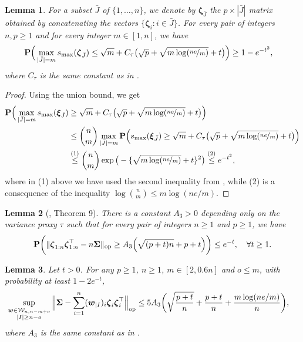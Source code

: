 \documentclass[aos,preprint,reqno]{imsart}
\newcommand\bxi{\boldsymbol\xi}
\newcommand\bzeta{\boldsymbol\zeta}
\newcommand\bSigma{\boldsymbol\Sigma}
\newcommand\bfP{\mathbf P}
\newcommand\bw{\boldsymbol w}
\theoremstyle{plain}
\newtheorem{lemma}{Lemma}
\theoremstyle{remark}
\begin{document}
	\begin{lemma} %
	For a subset $\bar J$ of $\{1,\ldots,n\}$, we denote by 
	$\bzeta_{\bar J}$ the $p\times |\bar J|$ matrix obtained by
	concatenating the vectors $\{\bzeta_i: i\in\bar J\}$. For every 
	pair of integers  $n,p\ge 1$ and for every integer $m\in[1,n]$,
	we have
	\begin{align}
		\bfP\Big(\max_{|\bar J| = m} s_{\max}(\bzeta_{\bar J}) &\le
				\sqrt{m} +  C_\tau\big(\sqrt{p} + \sqrt{m \log(\nicefrac{ne}{m})}
				+ t\big) \Big) \ge 1 - e^{-t^2},\label{esp:3bis}
	\end{align}	
	where $C_\tau$ is the same constant as in .
	\end{lemma} 
	\begin{proof}
	Using the union bound, we get
	\begin{align}
		\bfP\Big(\max_{|\bar J| = m} s_{\max}(\bxi_{\bar J}) &\ge
			\sqrt{m} +  C_\tau\big(\sqrt{p} + \sqrt{m \log( \nicefrac{ne}{m})} + t\big) \Big)\\ 
		&\le {n\choose{m}}\max_{|\bar J| = m} 
			\bfP\Big( s_{\max}(\bxi_{\bar J}) \ge \sqrt{m} +
			C_\tau\big(\sqrt{p} + \sqrt{m \log(\nicefrac{ne}{m})}+ 
			t\big) \Big)\\
		&\stackrel{(1)}{\le} {n\choose{m}} \exp\big(-\{
		\sqrt{m \log(\nicefrac{ne}{m})} +t\}^2\big)
		\stackrel{(2)}{\le} e^{-t^2},
	\end{align}	
	where in (1) above we have used the second inequality from
	, while (2) is a consequence of
	the inequality $\log{n\choose{m}}\le m\log(ne/m)$. 
	\end{proof}
    
	
	\begin{lemma}[\cite{KoltchLounici}, Theorem 9] \label{lem:smax:bis}
	There is a constant $A_3>0$ depending only on the variance proxy $\tau$ such that for every pair of integers
	$n\ge 1$ and $p\ge 1$, we have
	\begin{align}
		\bfP\bigg(\|\bzeta_{1:n}\bzeta_{1:n}^\top-n\bSigma\|_{\textup{op}}
		\ge A_3\Big(\sqrt{(p+t)n} + p + t\Big)\bigg)\le e^{-t},\quad \forall t\ge 1.
	\end{align}
	\end{lemma} 

    
    
	\begin{lemma}\label{lemma3:bis}
	Let $t>0$. For any $p\ge 1$, $n\ge 1$, $m\in[2,0.6n]$ and $o\le m$, with probability at least $1-2e^{-t}$,
	\begin{align}
		\sup_{\substack{\bw\in \mathcal W_{n,n-m+o} \\ |I| \ge n-o}}
		\Big\|\bSigma & - \sum_{i=1}^n (\bw_{|I})_i\bzeta_i\bzeta_i^\top
		\Big\|_{\textup{op}} \le  5A_3 \bigg( \sqrt{ \frac{p+t}{n}} + 
			\frac{p + t}{n} + \frac{m\log(ne/m)}{n}\bigg),
	\end{align}
	where $A_3$ is the same constant as in .
	\end{lemma}
\end{document}
